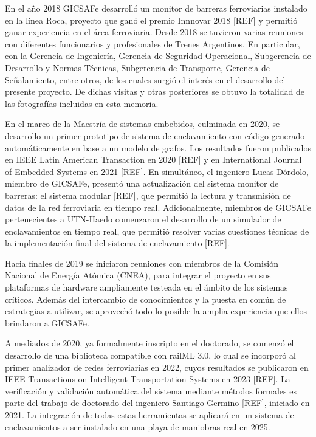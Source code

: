     En el año 2018 GICSAFe desarrolló un monitor de barreras ferroviarias instalado en la línea Roca, proyecto que ganó el premio Innnovar 2018 [REF] y permitió ganar experiencia en el área ferroviaria. Desde 2018 se tuvieron varias reuniones con diferentes funcionarios y profesionales de Trenes Argentinos. En particular, con la Gerencia de Ingeniería, Gerencia de Seguridad Operacional, Subgerencia de Desarrollo y Normas Técnicas, Subgerencia de Transporte, Gerencia de Señalamiento, entre otros, de los cuales surgió el interés en el desarrollo del presente proyecto. De dichas visitas y otras posteriores se obtuvo la totalidad de las fotografías incluidas en esta memoria. 

    En el marco de la Maestría de sistemas embebidos, culminada en 2020, se desarrollo un primer prototipo de sistema de enclavamiento con código generado automáticamente en base a un modelo de grafos. Los resultados fueron publicados en IEEE Latin American Transaction en 2020 [REF] y en International Journal of Embedded Systems en 2021 [REF]. En simultáneo, el ingeniero Lucas Dórdolo, miembro de GICSAFe, presentó una actualización del sistema monitor de barreras: el sistema modular [REF], que permitió la lectura y transmisión de datos de la red ferroviaria en tiempo real. Adicionalmente, miembros de GICSAFe pertenecientes a UTN-Haedo comenzaron el desarrollo de un simulador de enclavamientos en tiempo real, que permitió resolver varias cuestiones técnicas de la implementación final del sistema de enclavamiento [REF].

    Hacia finales de 2019 se iniciaron reuniones con miembros de la Comisión Nacional de Energía Atómica (CNEA), para integrar el proyecto en sus plataformas de hardware ampliamente testeada en el ámbito de los sistemas críticos. Además del intercambio de conocimientos y la puesta en común de estrategias a utilizar, se aprovechó todo lo posible la amplia experiencia que ellos brindaron a GICSAFe.
    
    A mediados de 2020, ya formalmente inscripto en el doctorado, se comenzó el desarrollo de una biblioteca compatible con railML 3.0, lo cual se incorporó al primer analizador de redes ferroviarias en 2022, cuyos resultados se publicaron en IEEE Transactions on Intelligent Transportation Systems en 2023 [REF]. La verificación y validación automática del sistema mediante métodos formales es parte del trabajo de doctorado del ingeniero Santiago Germino [REF], iniciado en 2021. La integración de todas estas herramientas se aplicará en un sistema de enclavamientos a ser instalado en una playa de maniobras real en 2025. 